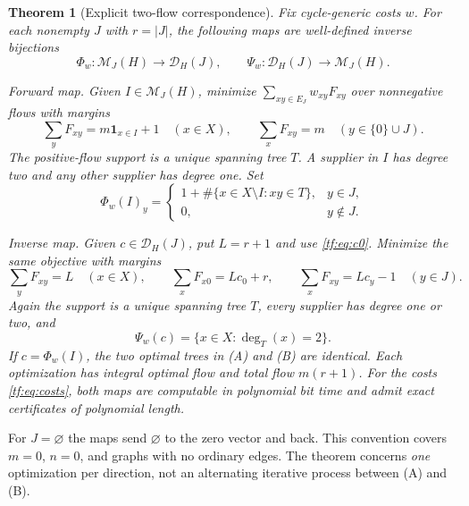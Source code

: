 \documentclass[11pt]{article}
\numberwithin{equation}{section}
\newtheorem{theorem}{Theorem}[section]
\theoremstyle{definition}
\newcommand{\one}{\mathbf 1}
\newcommand{\PM}{\mathcal M}
\newcommand{\cD}{\mathcal D}
\begin{document}
\begin{theorem}[Explicit two-flow correspondence]
\label{tf:thm:main}
Fix cycle-generic costs $w$. For each nonempty $J$ with $r=|J|$,
the following maps are well-defined inverse bijections
\[
 \Phi_w:\PM_J(H)\longrightarrow\cD_H(J),\qquad
 \Psi_w:\cD_H(J)\longrightarrow\PM_J(H).
\]

\emph{Forward map.} Given $I\in\PM_J(H)$, minimize
$\sum_{xy\in E_J}w_{xy}F_{xy}$ over nonnegative flows with margins
\begingroup\renewcommand{\theHequation}{tf.two-flow.A}%
\begin{equation}
 \sum_y F_{xy}=m\one_{x\in I}+1\quad(x\in X),\qquad
 \sum_x F_{xy}=m\quad(y\in\{0\}\cup J).
 \tag{A}\label{tf:eq:A}
\end{equation}\endgroup
The positive-flow support is a unique spanning tree $T$. A supplier in
$I$ has degree two and any other supplier has degree one. Set
\begin{equation}
 \Phi_w(I)_y=
 \begin{cases}
 1+\#\{x\in X\setminus I:xy\in T\},&y\in J,\\
 0,&y\notin J.
 \end{cases}
 \label{tf:eq:leaf}
\end{equation}

\emph{Inverse map.} Given $c\in\cD_H(J)$, put $L=r+1$ and use
\eqref{tf:eq:c0}. Minimize the same objective with margins
\begingroup\renewcommand{\theHequation}{tf.two-flow.B}%
\begin{equation}
 \sum_y F_{xy}=L\quad(x\in X),\qquad
 \sum_xF_{x0}=Lc_0+r,\qquad
 \sum_xF_{xy}=Lc_y-1\quad(y\in J).
 \tag{B}\label{tf:eq:B}
\end{equation}\endgroup
Again the support is a unique spanning tree $T$, every supplier has
degree one or two, and
\begin{equation}
 \Psi_w(c)=\{x\in X:\deg_T(x)=2\}.
 \label{tf:eq:inverse}
\end{equation}
If $c=\Phi_w(I)$, the two optimal trees in (A) and (B) are identical.
Each optimization has integral optimal flow and total flow $m(r+1)$.
For the costs \eqref{tf:eq:costs}, both maps are computable in polynomial bit
time and admit exact certificates of polynomial length.
\end{theorem}

For $J=\varnothing$ the maps send $\varnothing$ to the zero vector and
back. This convention covers $m=0$, $n=0$, and graphs with no ordinary
edges. The theorem concerns \emph{one} optimization per direction, not
an alternating iterative process between (A) and (B).
\end{document}
